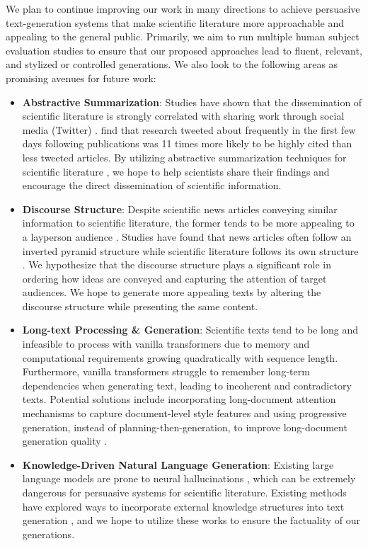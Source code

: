 We plan to continue improving our work in many directions to achieve persuasive text-generation systems that make scientific literature more approachable and appealing to the general public. Primarily, we aim to run multiple human subject evaluation studies to ensure that our proposed approaches lead to fluent, relevant, and stylized or controlled generations. We also look to the following areas as promising avenues for future work:

\begin{itemize}
    \item \textbf{Abstractive Summarization}: Studies have shown that the dissemination of scientific literature is strongly correlated with sharing work through social media (\eg Twitter) \citep{eysenbach2011can, tahamtan2016factors}. \citet{eysenbach2011can} find that research tweeted about frequently in the first few days following publications was 11 times more likely to be highly cited than less tweeted articles. By utilizing abstractive summarization techniques for scientific literature \citep{cohan2018discourse, altmami2020automatic}, we hope to help scientists share their findings and encourage the direct dissemination of scientific information.

    \item \textbf{Discourse Structure}: Despite scientific news articles conveying similar information to scientific literature, the former tends to be more appealing to a layperson audience \citep{plaven2017research}. Studies have found that news articles often follow an inverted pyramid structure while scientific literature follows its own structure \citep{rafiee2018culture, cohan2018discourse}. We hypothesize that the discourse structure plays a significant role in ordering how ideas are conveyed and capturing the attention of target audiences. We hope to generate more appealing texts by altering the discourse structure while presenting the same content.
    
    \item \textbf{Long-text Processing \& Generation}: Scientific texts tend to be long \citep{tretyak2020combination} and infeasible to process with vanilla transformers \citep{vaswani2017attention} due to memory and computational requirements growing quadratically with sequence length. Furthermore, vanilla transformers struggle to remember long-term dependencies when generating text, leading to incoherent and contradictory texts. Potential solutions include incorporating long-document attention mechanisms \citep{beltagy2020longformer, zaheer2020big} to capture document-level style features and using progressive generation, instead of planning-then-generation, to improve long-document generation quality \citep{Tan2020}.
    
    \item \textbf{Knowledge-Driven Natural Language Generation}: Existing large language models are prone to neural hallucinations \citep{ji2022survey}, which can be extremely dangerous for persuasive systems for scientific literature. Existing methods have explored ways to incorporate external knowledge structures into text generation \citep{yu2022survey, wang2019paperrobot}, and we hope to utilize these works to ensure the factuality of our generations.
\end{itemize}